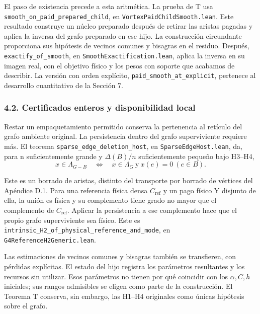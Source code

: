 \documentclass[spanish,11pt,a4paper]{article}
\begin{document}
El paso de existencia precede a esta aritmética. La prueba de T usa \texttt{smooth\_\allowbreak{}on\_\allowbreak{}paid\_\allowbreak{}prepared\_\allowbreak{}child}, en \texttt{Vortex\allowbreak{}Paid\allowbreak{}Child\allowbreak{}Smooth.\allowbreak{}lean}. Este resultado construye un núcleo preparado después de retirar las aristas pagadas y aplica la inversa del grafo preparado en ese hijo. La construcción circundante proporciona sus hipótesis de vecinos comunes y bisagras en el residuo. Después, \texttt{exactify\_\allowbreak{}of\_\allowbreak{}smooth}, en \texttt{Smooth\allowbreak{}Exactification.\allowbreak{}lean}, aplica la inversa en su imagen real, con el objetivo físico y los pesos con soporte que acabamos de describir. La versión con orden explícito, \texttt{paid\_\allowbreak{}smooth\_\allowbreak{}at\_\allowbreak{}explicit}, pertenece al desarrollo cuantitativo de la Sección 7.

\subsubsection{4.2. Certificados enteros y disponibilidad local}\label{certificados-enteros-y-disponibilidad-local}

Restar un empaquetamiento permitido conserva la pertenencia al retículo del grafo ambiente original. La persistencia dentro del grafo superviviente requiere más. El teorema \texttt{sparse\_\allowbreak{}edge\_\allowbreak{}deletion\_\allowbreak{}host}, en \texttt{Sparse\allowbreak{}Edge\allowbreak{}Host.\allowbreak{}lean}, da, para n suficientemente grande y \(\Delta(B)/n\) suficientemente pequeño bajo H3--H4,
\[x\in\Lambda_{G-B}\quad\Longleftrightarrow\quad x\in\Lambda_G\ \text{y}\ x(e)=0\ (e\in B).\]

Este es un borrado de aristas, distinto del transporte por borrado de vértices del Apéndice D.1. Para una referencia física densa \(C_{\mathrm{ref}}\) y un pago físico Y disjunto de ella, la unión es física y su complemento tiene grado no mayor que el complemento de \(C_{\mathrm{ref}}\). Aplicar la persistencia a ese complemento hace que el propio grafo superviviente sea físico. Este es \texttt{intrinsic\_\allowbreak{}H2\_\allowbreak{}of\_\allowbreak{}physical\_\allowbreak{}reference\_\allowbreak{}and\_\allowbreak{}mode}, en \texttt{G4Reference\allowbreak{}H2Generic.\allowbreak{}lean}.

Las estimaciones de vecinos comunes y bisagras también se transfieren, con pérdidas explícitas. El estado del hijo registra los parámetros resultantes y los recursos sin utilizar. Esos parámetros no tienen por qué coincidir con los \(\alpha,C,h\) iniciales; sus rangos admisibles se eligen como parte de la construcción. El Teorema T conserva, sin embargo, las H1--H4 originales como únicas hipótesis sobre el grafo.
\end{document}
